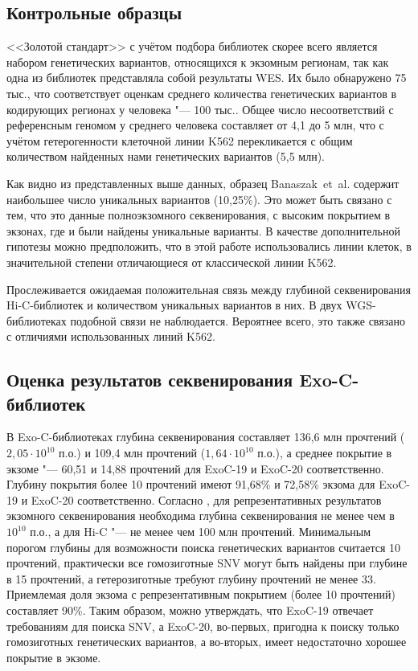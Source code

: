 \documentclass[a4paper,12pt]{article}
\begin{document}
\subsection{Контрольные образцы}

<<Золотой стандарт>> с учётом подбора библиотек скорее всего является набором генетических вариантов, относящихся к экзомным регионам, так как одна из библиотек представляла собой результаты WES.
Их было обнаружено 75 тыс., что соответствует оценкам среднего количества генетических вариантов в кодирующих регионах у человека "--- 100 тыс.\cite{Supernat_2018}.
Общее число несоответствий с референсным геномом у среднего человека составляет от 4,1 до 5 млн\cite{Auton_2015}, что с учётом гетерогенности клеточной линии K562 перекликается с общим количеством найденных нами генетических вариантов (5,5 млн).

Как видно из представленных выше данных, образец Banaszak~et~al. содержит наибольшее число уникальных вариантов (10,25\%).
Это может быть связано с тем, что это данные полноэкзомного секвенирования, с высоким покрытием в экзонах, где и были найдены уникальные варианты.
В качестве дополнительной гипотезы можно предположить, что в этой работе использовались линии клеток, в значительной степени отличающиеся от классической линии K562.

Прослеживается ожидаемая положительная связь между глубиной секвенирования Hi-C-библиотек и количеством уникальных вариантов в них.
В двух WGS-библиотеках подобной связи не наблюдается.
Вероятнее всего, это также связано с отличиями использованных линий K562.

\subsection{Оценка результатов секвенирования Exo-C-библиотек}

В Exo-C-библиотеках глубина секвенирования составляет 136,6 млн прочтений ($2,05 \cdot 10^{10}$ п.о.) и 109,4 млн прочтений ($1,64 \cdot 10^{10}$ п.о.), а среднее покрытие в экзоме "--- 60,51 и 14,88 прочтений для ExoC-19 и ExoC-20 соответственно.
Глубину покрытия более 10 прочтений имеют 91,68\% и 72,58\% экзома для ExoC-19 и ExoC-20 соответственно.
Согласно \cite{Sims_2014}, для репрезентативных результатов экзомного секвенирования необходима глубина секвенирования не менее чем в $10^{10}$ п.о., а для Hi-C "--- не менее чем 100 млн прочтений.
Минимальным порогом глубины для возможности поиска генетических вариантов считается 10 прочтений, практически все гомозиготные SNV могут быть найдены при глубине в 15 прочтений, а гетерозиготные требуют глубину прочтений не менее 33.
Приемлемая доля экзома с репрезентативным покрытием (более 10 прочтений) составляет 90\%.
Таким образом, можно утверждать, что ExoC-19 отвечает требованиям для поиска SNV, а ExoC-20, во-первых, пригодна к поиску только гомозиготных генетических вариантов, а во-вторых, имеет недостаточно хорошее покрытие в экзоме.
\end{document}
